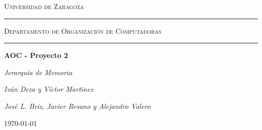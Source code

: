 \documentclass{article}
\begin{document}
\begin{titlepage}
    \centering
    \vspace*{\fill}
    \begin{figure}[htbp]
        \centering
    \end{figure}
    \vspace*{\fill}
    
    {\scshape\LARGE Universidad de Zaragoza \par}
    \vspace{0.5cm}
    \rule{\linewidth}{0.5mm} %
    \vspace{0.5cm}
    {\scshape\Large Departamento de Organización de Computadoras \par}
    \vspace{0.5cm}
    \rule{\linewidth}{0.5mm} %
    \vspace{1.5cm}
    {\huge\bfseries AOC - Proyecto 2\par}
    \vspace{0.5cm}
    {\Large\itshape Jerarquía de Memoria \par}
    \vspace{2cm}
    {\Large\itshape Iván Deza y Víctor Martinez \par}
    \vspace{0.5cm}
    {\Large\itshape José L. Briz, Javier Resano y Alejandro Valero \par}
    \vfill
    {\large \today\par}
\end{titlepage}
\end{document}
